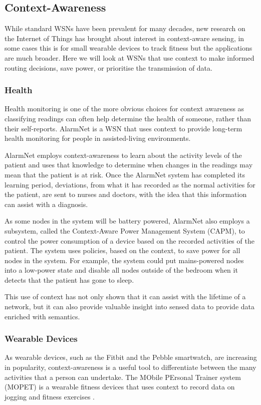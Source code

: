 \subsection{Context-Awareness}
	While standard WSNs have been prevalent for many decades, new research on the Internet of Things \cite{Atzori2010} has brought about interest in context-aware sensing, in some cases this is for small wearable devices to track fitness but the applications are much broader. Here we will look at WSNs that use context to make informed routing decisions, save power, or prioritise the transmission of data.

	\subsubsection{Health}
		Health monitoring is one of the more obvious choices for context awareness as classifying readings can often help determine the health of someone, rather than their self-reports. AlarmNet is a WSN that uses context to provide long-term health monitoring for people in assisted-living environments.
	
AlarmNet employs context-awareness to learn about the activity levels of the patient and uses that knowledge to determine when changes in the readings may mean that the patient is at risk. Once the AlarmNet system has completed its learning period, deviations, from what it has recorded as the normal activities for the patient, are sent to nurses and doctors, with the idea that this information can assist with a diagnosis.

As some nodes in the system will be battery powered, AlarmNet also employs a subsystem, called the Context-Aware Power Management System (CAPM), to control the power consumption of a device based on the recorded activities of the patient. The system uses policies, based on the context, to save power for all nodes in the system. For example, the system could put mains-powered nodes into a low-power state and disable all nodes outside of the bedroom when it detects that the patient has gone to sleep.

This use of context has not only shown that it can assist with the lifetime of a network, but it can also provide valuable insight into sensed data to provide data enriched with semantics.

	\subsubsection{Wearable Devices}
As wearable devices, such as the Fitbit and the Pebble smartwatch, are increasing in popularity, context-awareness is a useful tool to differentiate between the many activities that a person can undertake. The MObile PErsonal Trainer system (MOPET) is a wearable fitness devices that uses context to record data on jogging and fitness exercises \cite{Buttussi2008}. 

